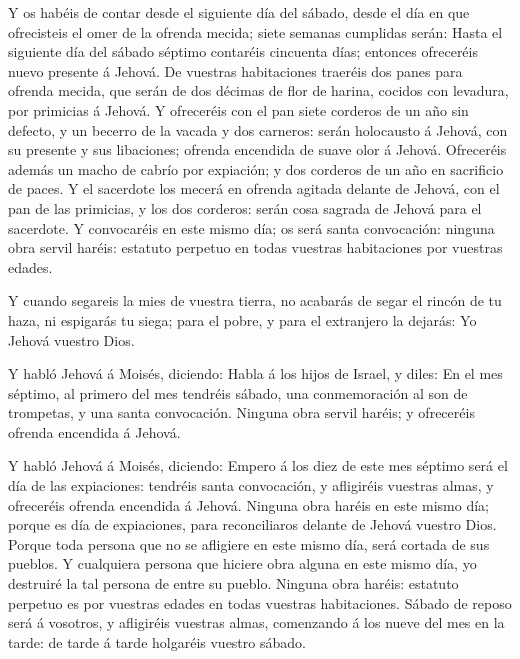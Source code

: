  Y os habéis de contar desde el siguiente día del sábado,
desde el día en que ofrecisteis el omer de la ofrenda mecida; siete
semanas cumplidas serán:  Hasta el siguiente día del sábado
séptimo contaréis cincuenta días; entonces ofreceréis nuevo presente á
Jehová.  De vuestras habitaciones traeréis dos panes para
ofrenda mecida, que serán de dos décimas de flor de harina, cocidos con
levadura, por primicias á Jehová.  Y ofreceréis con el pan
siete corderos de un año sin defecto, y un becerro de la vacada y dos
carneros: serán holocausto á Jehová, con su presente y sus libaciones;
ofrenda encendida de suave olor á Jehová.  Ofreceréis
además un macho de cabrío por expiación; y dos corderos de un año en
sacrificio de paces.  Y el sacerdote los mecerá en ofrenda
agitada delante de Jehová, con el pan de las primicias, y los dos
corderos: serán cosa sagrada de Jehová para el sacerdote. 
Y convocaréis en este mismo día; os será santa convocación: ninguna obra
servil haréis: estatuto perpetuo en todas vuestras habitaciones por
vuestras edades.

 Y cuando segareis la mies de vuestra tierra, no acabarás
de segar el rincón de tu haza, ni espigarás tu siega; para el pobre, y
para el extranjero la dejarás: Yo Jehová vuestro Dios.

 Y habló Jehová á Moisés, diciendo:  Habla á
los hijos de Israel, y diles: En el mes séptimo, al primero del mes
tendréis sábado, una conmemoración al son de trompetas, y una santa
convocación.  Ninguna obra servil haréis; y ofreceréis
ofrenda encendida á Jehová.

 Y habló Jehová á Moisés, diciendo:  Empero á
los diez de este mes séptimo será el día de las expiaciones: tendréis
santa convocación, y afligiréis vuestras almas, y ofreceréis ofrenda
encendida á Jehová.  Ninguna obra haréis en este mismo día;
porque es día de expiaciones, para reconciliaros delante de Jehová
vuestro Dios.  Porque toda persona que no se afligiere en
este mismo día, será cortada de sus pueblos.  Y cualquiera
persona que hiciere obra alguna en este mismo día, yo destruiré la tal
persona de entre su pueblo.  Ninguna obra haréis: estatuto
perpetuo es por vuestras edades en todas vuestras habitaciones.
 Sábado de reposo será á vosotros, y afligiréis vuestras
almas, comenzando á los nueve del mes en la tarde: de tarde á tarde
holgaréis vuestro sábado.

